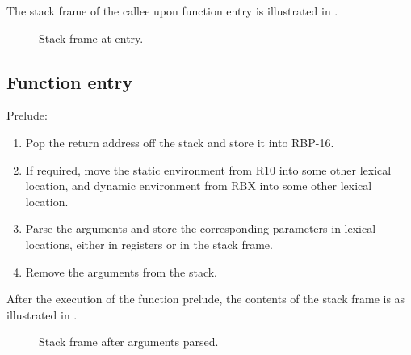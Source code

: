 The stack frame of the callee upon function entry is illustrated in
.

\begin{figure}
\begin{center}
\end{center}
\caption{\label{fig-x86-64-alternative-stack-frame-at-entry}
Stack frame at entry.}
\end{figure}

\subsection{Function entry}

Prelude:

\begin{enumerate}
\item Pop the return address off the stack and store it into RBP-16.
\item If required, move the static environment from R10 into some
  other lexical location, and dynamic environment from RBX into some
  other lexical location.
\item Parse the arguments and store the corresponding parameters in
  lexical locations, either in registers or in the stack frame.
\item Remove the arguments from the stack.
\end{enumerate}

After the execution of the function prelude, the contents of the stack
frame is as illustrated in
.

\begin{figure}
\begin{center}
\end{center}
\caption{\label{fig-x86-64-alternative-stack-frame-after-arguments-parsed}
Stack frame after arguments parsed.}
\end{figure}

